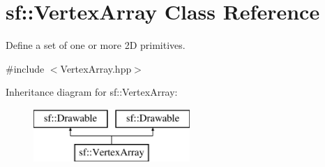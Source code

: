 \hypertarget{classsf_1_1_vertex_array}{\section{sf\-:\-:Vertex\-Array Class Reference}
\label{classsf_1_1_vertex_array}
}


Define a set of one or more 2\-D primitives.  




{\ttfamily \#include $<$Vertex\-Array.\-hpp$>$}

Inheritance diagram for sf\-:\-:Vertex\-Array\-:\begin{figure}[H]
\begin{center}
\leavevmode
\includegraphics[height=2.000000cm]{classsf_1_1_vertex_array}
\end{center}
\end{figure}
